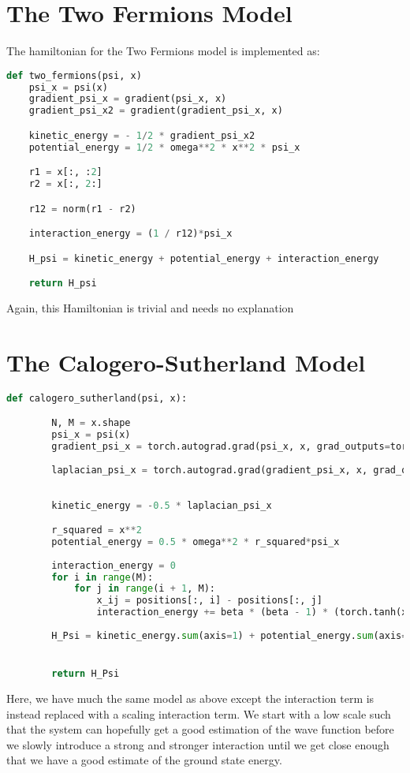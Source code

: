\documentclass[12pt]{article}
\begin{document}
{\section{The Two Fermions Model}
The hamiltonian for the Two Fermions model is implemented as:
\begin{lstlisting}[language=Python]
def two_fermions(psi, x)
    psi_x = psi(x)
    gradient_psi_x = gradient(psi_x, x)
    gradient_psi_x2 = gradient(gradient_psi_x, x)

    kinetic_energy = - 1/2 * gradient_psi_x2
    potential_energy = 1/2 * omega**2 * x**2 * psi_x

    r1 = x[:, :2]
    r2 = x[:, 2:]

    r12 = norm(r1 - r2)

    interaction_energy = (1 / r12)*psi_x

    H_psi = kinetic_energy + potential_energy + interaction_energy

    return H_psi
\end{lstlisting}
Again, this Hamiltonian is trivial and needs no explanation
\section{The Calogero-Sutherland Model}
\begin{lstlisting}[language=Python]
def calogero_sutherland(psi, x):

        N, M = x.shape
        psi_x = psi(x) 
        gradient_psi_x = torch.autograd.grad(psi_x, x, grad_outputs=torch.ones_like(psi_x), create_graph=True)[0]
        
        laplacian_psi_x = torch.autograd.grad(gradient_psi_x, x, grad_outputs=torch.ones_like(gradient_psi_x), create_graph=True)[0]
        
        
        kinetic_energy = -0.5 * laplacian_psi_x

        r_squared = x**2
        potential_energy = 0.5 * omega**2 * r_squared*psi_x
        
        interaction_energy = 0
        for i in range(M):
            for j in range(i + 1, M):
                x_ij = positions[:, i] - positions[:, j]
                interaction_energy += beta * (beta - 1) * (torch.tanh(x_ij / x_0)**2) / (x_ij**2)
        
        H_Psi = kinetic_energy.sum(axis=1) + potential_energy.sum(axis=1) + interaction_energy * psi_x


        return H_Psi
\end{lstlisting}
Here, we have much the same model as above except the interaction term is instead replaced with a scaling interaction term. We start with a low scale such that the system can hopefully get a good estimation of the wave function before we slowly introduce a strong and stronger interaction until we get close enough that we have a good estimate of the ground state energy.
}
\end{document}
